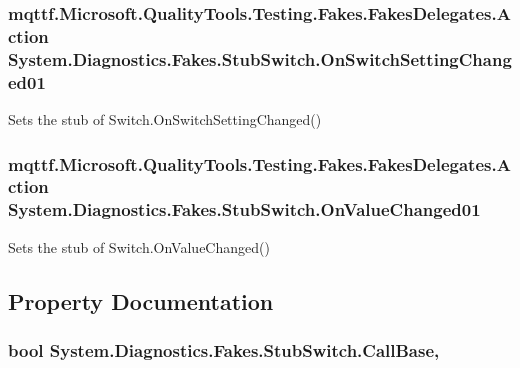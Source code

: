 \hypertarget{class_system_1_1_diagnostics_1_1_fakes_1_1_stub_switch_adb3cc8187966144876188ae4b5669c2e}{
\subsubsection[{On\-Switch\-Setting\-Changed01}]{\setlength{\rightskip}{0pt plus 5cm}mqttf.\-Microsoft.\-Quality\-Tools.\-Testing.\-Fakes.\-Fakes\-Delegates.\-Action System.\-Diagnostics.\-Fakes.\-Stub\-Switch.\-On\-Switch\-Setting\-Changed01}}\label{class_system_1_1_diagnostics_1_1_fakes_1_1_stub_switch_adb3cc8187966144876188ae4b5669c2e}


Sets the stub of Switch.\-On\-Switch\-Setting\-Changed()

\hypertarget{class_system_1_1_diagnostics_1_1_fakes_1_1_stub_switch_a8e0f676b9ba229d3b9f7a9a4e1e5d8e7}{
\subsubsection[{On\-Value\-Changed01}]{\setlength{\rightskip}{0pt plus 5cm}mqttf.\-Microsoft.\-Quality\-Tools.\-Testing.\-Fakes.\-Fakes\-Delegates.\-Action System.\-Diagnostics.\-Fakes.\-Stub\-Switch.\-On\-Value\-Changed01}}\label{class_system_1_1_diagnostics_1_1_fakes_1_1_stub_switch_a8e0f676b9ba229d3b9f7a9a4e1e5d8e7}


Sets the stub of Switch.\-On\-Value\-Changed()



\subsection{Property Documentation}
\hypertarget{class_system_1_1_diagnostics_1_1_fakes_1_1_stub_switch_a30af35a53f3c20bc95e0f27b0e2be920}{
\subsubsection[{Call\-Base}]{\setlength{\rightskip}{0pt plus 5cm}bool System.\-Diagnostics.\-Fakes.\-Stub\-Switch.\-Call\-Base\hspace{0.3cm}{\ttfamily [get]}, {\ttfamily [set]}}}\label{class_system_1_1_diagnostics_1_1_fakes_1_1_stub_switch_a30af35a53f3c20bc95e0f27b0e2be920}


